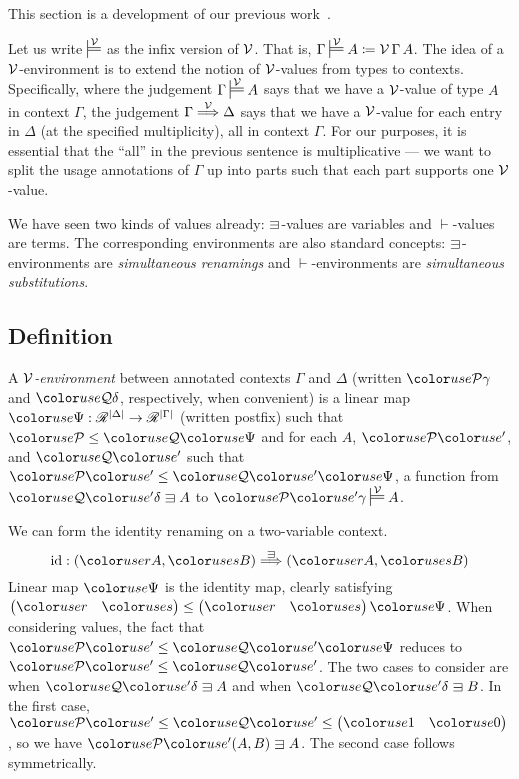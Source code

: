This section is a development of our previous work~\cite{WA20}. 

Let us write $\sdtstile{}\V$ as the infix version of $\mathcal V$.
That is, $\Gamma \sdtstile{}\V A \coloneqq \V\,\Gamma\,A$.
The idea of a $\mathcal V$-environment is to extend the notion of $\mathcal V$-values from
types to contexts.
Specifically, where the judgement $\Gamma \sdtstile{}\V A$ says that we
have a $\mathcal V$-value of type $A$ in context $\Gamma$, the judgement
$\Gamma \stackrel{\mathcal V}\Longrightarrow \Delta$ says that we have a $\mathcal V$-value for each entry in
$\Delta$ (at the specified multiplicity), all in context $\Gamma$.
For our purposes, it is essential that the ``all'' in the previous sentence is
multiplicative --- we want to split the usage annotations of $\Gamma$ up into
parts such that each part supports one $\mathcal V$-value.

We have seen two kinds of values already: $\sqni$-values are variables and
$\vdash$-values are terms.
The corresponding environments are also standard concepts: $\sqni$-environments
are \emph{simultaneous renamings} and $\vdash$-environments are
\emph{simultaneous substitutions}.

\subsection{Definition}

\begin{definition}\label{def:lr-env}
  A \emph{$\mathcal V$-environment} between annotated contexts $\Gamma$ and $\Delta$
  (written $\grP\gamma$ and $\grQ\delta$, respectively, when convenient)
  is a linear map $\gr\Psi : \Ann^{\size\Delta} \to \Ann^{\size\Gamma}$ (written
  postfix) such that $\grP \leq \grQ\gr\Psi$ and for each $A$, $\grPprime$, and
  $\grQprime$ such that $\grPprime \leq \grQprime\gr\Psi$, a function from
  $\grQprime\delta \sqni A$ to $\grPprime\gamma \sdtstile{}\V A$.
\end{definition}

\begin{example}
  We can form the identity renaming on a two-variable context.
  \[
    \id : \plr{\gr rA, \gr sB} \env\sqni \plr{\gr rA, \gr sB}
  \]
  Linear map $\gr\Psi$ is the identity map, clearly satisfying
  \(
    \begin{pmatrix} \gr r & \gr s \end{pmatrix} \leq
    \begin{pmatrix} \gr r & \gr s \end{pmatrix}\gr\Psi
  \).
  When considering values, the fact that $\grPprime \leq \grQprime\gr\Psi$
  reduces to $\grPprime \leq \grQprime$.
  The two cases to consider are when $\grQprime\delta \sqni A$ and when
  $\grQprime\delta \sqni B$.
  In the first case, $\grPprime \leq \grQprime \leq
  \begin{pmatrix} \gr1 & \gr0 \end{pmatrix}$, so we have
  $\grPprime\plr{A, B} \sqni A$.
  The second case follows symmetrically.
\end{example}

